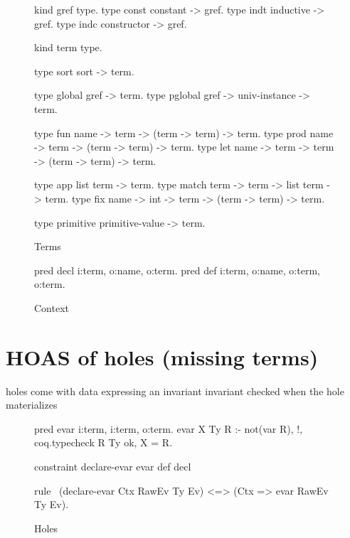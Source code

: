 \documentclass[a4paper, 11pt]{book}
\begin{document}
\begin{figure}
\begin{elpicode}
kind gref type.
type const constant -> gref. %
type indt inductive -> gref. %
type indc constructor -> gref. %

kind term type.

type sort  sort -> term. %

type global gref -> term.
type pglobal gref -> univ-instance -> term.

type fun  name -> term -> (term -> term) -> term.         %
type prod name -> term -> (term -> term) -> term.         %
type let  name -> term -> term -> (term -> term) -> term. %

type app   list term -> term.                   %
type match term -> term -> list term -> term.   %
type fix   name -> int -> term -> (term -> term) -> term. %

type primitive primitive-value -> term.
\end{elpicode}
\caption[terms]{Terms\label{hoas:term}}
\end{figure}
  
\begin{figure}
\begin{elpicode}
pred decl i:term, o:name, o:term. %
pred def  i:term, o:name, o:term, o:term. %
\end{elpicode}
\caption[context]{Context\label{hoas:context}}
\end{figure}

\section{HOAS of holes (missing terms)}

holes come with data expressing an invariant
invariant checked when the hole materializes


\begin{figure}
\begin{elpicode}
pred evar i:term, i:term, o:term. %
evar X Ty R :- not(var R), !, coq.typecheck R Ty ok, X = R.
 
constraint declare-evar evar def decl {

rule \ (declare-evar Ctx RawEv Ty Ev) <=> (Ctx => evar RawEv Ty Ev).
   
}
\end{elpicode}
\caption[holes]{Holes\label{hoas:holes}}
\end{figure}
\end{document}
